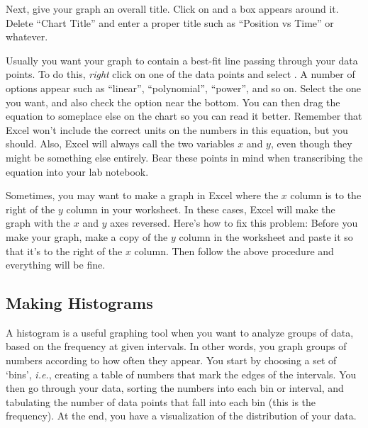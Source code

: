 Next, give your graph an overall title. Click on  and a box 
appears around it. Delete ``Chart Title'' and enter a proper title such as 
``Position vs Time'' or whatever.
\vspace{0.5cm}

Usually you want your graph to contain a best-fit line passing
through your data points.  To do this, \textit{right} click on one of the data points 
and select . A number of options appear such as 
``linear'', ``polynomial'', ``power'', and so on.  Select the one you want, 
and also check the  option near the bottom. 
You can then drag the equation to someplace else on the chart so you can read 
it better. Remember that Excel won't include the correct units on the numbers 
in this equation, but you should.  Also, Excel will always call the two 
variables $x$ and $y$, even though they might be something else entirely. Bear 
these points in mind when transcribing the equation into your lab notebook.
\vspace{0.5cm}



Sometimes, you may want to make a graph in Excel where the $x$ column
is to the right of the $y$ column in your worksheet.  In these cases,
Excel will make the graph with the $x$ and $y$ axes reversed. Here's how 
to fix this problem:  Before you make your graph,  make a copy of the $y$ 
column in the worksheet and paste it so that it's to the right of the $x$ 
column.  Then follow the above procedure and everything will be fine.


\subsection{Making Histograms}

A histogram is a useful graphing tool when you want to analyze groups of data, based on the frequency at given intervals. 
In other words, you graph groups of numbers according to how often they appear.
You start by choosing a set of `bins', {\it i.e.}, creating a table of numbers that mark the edges of the intervals.
You then go through your data, sorting the numbers into each bin or interval, and tabulating the number of data points that fall into each bin (this is the 
frequency).
At the end, you have a visualization of the distribution of your data.   

